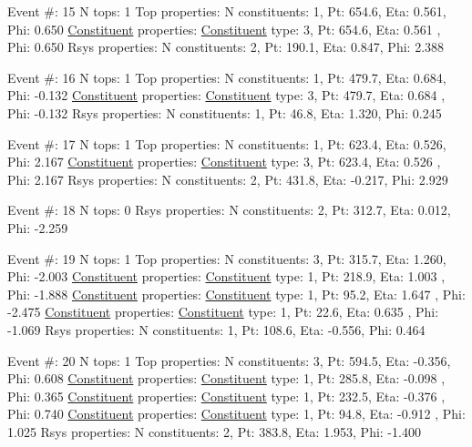 \begin{DoxyCode}
Event #: 15
      N tops: 1
      Top properties: N constituents:   1,   Pt:  654.6,   Eta:   0.561,   Phi:   0.650
          \hyperlink{classConstituent}{Constituent} properties: \hyperlink{classConstituent}{Constituent} type:   3,   Pt:  654.6,   Eta:   0.561
      ,   Phi:   0.650
      Rsys properties: N constituents:   2,   Pt:  190.1,   Eta:   0.847,   Phi:   2.388

Event #: 16
      N tops: 1
      Top properties: N constituents:   1,   Pt:  479.7,   Eta:   0.684,   Phi:  -0.132
          \hyperlink{classConstituent}{Constituent} properties: \hyperlink{classConstituent}{Constituent} type:   3,   Pt:  479.7,   Eta:   0.684
      ,   Phi:  -0.132
      Rsys properties: N constituents:   1,   Pt:   46.8,   Eta:   1.320,   Phi:   0.245

Event #: 17
      N tops: 1
      Top properties: N constituents:   1,   Pt:  623.4,   Eta:   0.526,   Phi:   2.167
          \hyperlink{classConstituent}{Constituent} properties: \hyperlink{classConstituent}{Constituent} type:   3,   Pt:  623.4,   Eta:   0.526
      ,   Phi:   2.167
      Rsys properties: N constituents:   2,   Pt:  431.8,   Eta:  -0.217,   Phi:   2.929

Event #: 18
      N tops: 0
      Rsys properties: N constituents:   2,   Pt:  312.7,   Eta:   0.012,   Phi:  -2.259

Event #: 19
      N tops: 1
      Top properties: N constituents:   3,   Pt:  315.7,   Eta:   1.260,   Phi:  -2.003
          \hyperlink{classConstituent}{Constituent} properties: \hyperlink{classConstituent}{Constituent} type:   1,   Pt:  218.9,   Eta:   1.003
      ,   Phi:  -1.888
          \hyperlink{classConstituent}{Constituent} properties: \hyperlink{classConstituent}{Constituent} type:   1,   Pt:   95.2,   Eta:   1.647
      ,   Phi:  -2.475
          \hyperlink{classConstituent}{Constituent} properties: \hyperlink{classConstituent}{Constituent} type:   1,   Pt:   22.6,   Eta:   0.635
      ,   Phi:  -1.069
      Rsys properties: N constituents:   1,   Pt:  108.6,   Eta:  -0.556,   Phi:   0.464

Event #: 20
      N tops: 1
      Top properties: N constituents:   3,   Pt:  594.5,   Eta:  -0.356,   Phi:   0.608
          \hyperlink{classConstituent}{Constituent} properties: \hyperlink{classConstituent}{Constituent} type:   1,   Pt:  285.8,   Eta:  -0.098
      ,   Phi:   0.365
          \hyperlink{classConstituent}{Constituent} properties: \hyperlink{classConstituent}{Constituent} type:   1,   Pt:  232.5,   Eta:  -0.376
      ,   Phi:   0.740
          \hyperlink{classConstituent}{Constituent} properties: \hyperlink{classConstituent}{Constituent} type:   1,   Pt:   94.8,   Eta:  -0.912
      ,   Phi:   1.025
      Rsys properties: N constituents:   2,   Pt:  383.8,   Eta:   1.953,   Phi:  -1.400


\end{DoxyCode}
